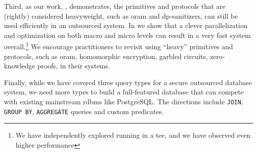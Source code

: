 	Third, as our work, \epsolute{}, demonstrates, the primitives and protocols that are (rightly) considered heavyweight, such as \acrshort{oram} and \acrshort{dp}-sanitizers, can still be used efficiently in an outsourced system.
	In \epsolute{} we show that a clever parallelization and optimization on both macro and micro levels can result in a very fast system overall.\footnote{
		We have independently explored running \epsolute{} in a \acrlong{tee}, and we have observed even higher performance
	}
	We encourage practitioners to revisit using ``heavy'' primitives and protocols, such as \acrshort{oram}, homomorphic encryption, garbled circuits, zero-knowledge proofs, in their systems.

	Finally, while we have covered three query types for a secure outsourced database system, we need more types to build a full-featured database that can compete with existing mainstream \acrshort{rdbms} like PostgreSQL\@.
	The directions include \texttt{JOIN}, \texttt{GROUP BY}, \texttt{AGGREGATE} queries and custom predicates.
